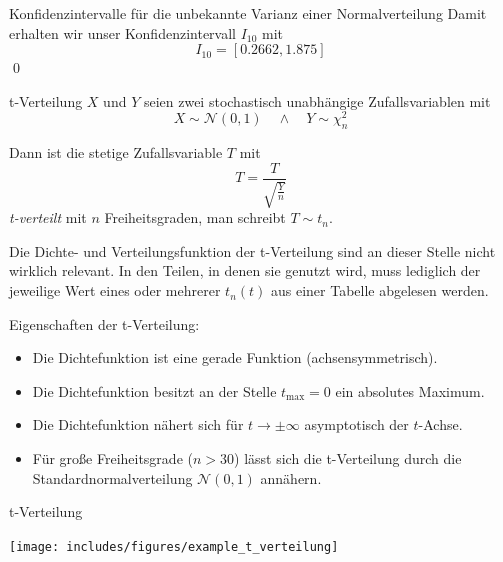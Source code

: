 \begin{example}{Konfidenzintervalle für die unbekannte Varianz einer Normalverteilung}
    Damit erhalten wir unser Konfidenzintervall $I_{10}$ mit
    \[
        I_{10} = [0.2662, 1.875]
    \]
    \qed
\end{example}

\begin{defi}{t-Verteilung}
    $X$ und $Y$ seien zwei stochastisch unabhängige Zufallsvariablen mit
    \[
        X \sim \mathcal{N}(0, 1) \quad \land \quad Y \sim \chi^2_n
    \]

    Dann ist die stetige Zufallsvariable $T$ mit
    \[
        T = \frac{T}{\sqrt{\frac{Y}{n}}}
    \]
    \emph{t-verteilt} mit $n$ Freiheitsgraden, man schreibt $T \sim t_n$.

    Die Dichte- und Verteilungsfunktion der t-Verteilung sind an dieser Stelle nicht wirklich relevant.
    In den Teilen, in denen sie genutzt wird, muss lediglich der jeweilige Wert eines oder mehrerer $t_n (t)$ aus einer Tabelle abgelesen werden.

    Eigenschaften der t-Verteilung:
    \begin{itemize}
        \item Die Dichtefunktion ist eine gerade Funktion (achsensymmetrisch).
        \item Die Dichtefunktion besitzt an der Stelle $t_{\max} = 0$ ein absolutes Maximum.
        \item Die Dichtefunktion nähert sich für $t \to \pm \infty$ asymptotisch der $t$-Achse.
        \item Für große Freiheitsgrade ($n > 30$) lässt sich die t-Verteilung durch die Standardnormalverteilung $\mathcal{N}(0, 1)$ annähern.
    \end{itemize}
\end{defi}

\begin{example}{t-Verteilung}
    \begin{center}
        \texttt{[image: includes/figures/example\_t\_verteilung]}
    \end{center}
\end{example}

